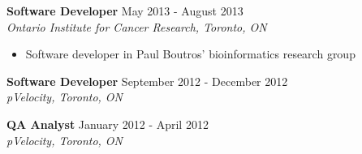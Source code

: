 \documentclass[10pt]{res} %
\begin{document}
\textbf{Software Developer} \hfill May 2013 - August 2013 \\[2pt]
{\sl Ontario Institute for Cancer Research, Toronto, ON} 
\begin{itemize}  %
    \item Software developer in Paul Boutros' bioinformatics research group
\end{itemize}

\textbf{Software Developer} \hfill September 2012 - December 2012 \\[2pt]
{\sl pVelocity, Toronto, ON} 

\textbf{QA Analyst} \hfill January 2012 - April 2012 \\[2pt]
{\sl pVelocity, Toronto, ON} 




\end{document}
